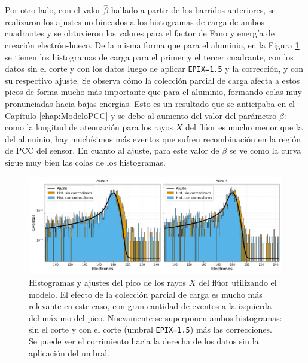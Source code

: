 Por otro lado, con el valor $\hat{\beta}$ hallado a partir de los barridos anteriores, se realizaron los ajustes no bineados a los histogramas de carga de ambos cuadrantes y se obtuvieron los valores para el factor de Fano y energía de creación electrón-hueco. De la misma forma que para el aluminio, en la Figura \ref{fig:F_OHDU1y3_EPIX15conCorr} se tienen los histogramas de carga para el primer y el tercer cuadrante, con los datos sin el corte y con los datos luego de aplicar \verb|EPIX=1.5| y la corrección, y con su respectivo ajuste. Se observa cómo la colección parcial de carga afecta a estos picos de forma mucho más importante que para el aluminio, formando colas muy pronunciadas hacia bajas energías. Esto es un resultado que se anticipaba en el Capítulo \ref{chap:ModeloPCC} y se debe al aumento del valor del parámetro $\beta$: como la longitud de atenuación para los rayos $X$ del flúor es mucho menor que la del aluminio, hay muchísimos más eventos que sufren recombinación en la región de PCC del sensor. En cuanto al ajuste, para este valor de $\beta$ se ve como la curva sigue muy bien las colas de los histogramas.
\begin{figure}[h]
    \centering
    \includegraphics[scale=0.5]{Figs/F_hists_ohdu1y3_dobles.pdf}
    \caption{Histogramas y ajustes del pico de los rayos $X$ del flúor utilizando el modelo. El efecto de la colección parcial de carga es mucho más relevante en este caso, con gran cantidad de eventos a la izquierda del máximo del pico. Nuevamente se superponen ambos histogramas: sin el corte y con el corte (umbral \texttt{EPIX=1.5}) más las correcciones. Se puede ver el corrimiento hacia la derecha de los datos sin la aplicación del umbral.}
    \label{fig:F_OHDU1y3_EPIX15conCorr}
\end{figure}

